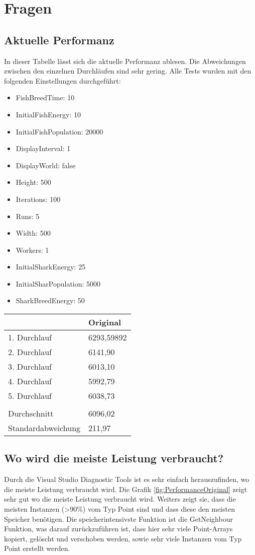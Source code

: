 \documentclass[a4paper,ngerman]{scrartcl}
\begin{document}
\section{Fragen}
\subsection{Aktuelle Performanz}
In dieser Tabelle lässt sich die aktuelle Performanz ablesen. Die Abweichungen zwischen den einzelnen Durchläufen sind sehr gering. Alle Tests wurden mit den folgenden Einstellungen durchgeführt:

\begin{itemize}
	\item FishBreedTime: 10
	\item InitialFishEnergy: 10
	\item InitialFishPopulation: 20000
	\item DisplayInterval: 1
	\item DisplayWorld: false
	\item Height: 500
	\item Iterations: 100
	\item Runs: 5
	\item Width: 500
	\item Workers: 1
	\item InitialSharkEnergy: 25
	\item InitialSharPopulation: 5000
	\item SharkBreedEnergy: 50
\end{itemize}

\centering
\begin{tabular}{l|l}
                               & Original  \\ \hline
1. Durchlauf                   & 6293,59892 \\
2. Durchlauf                   & 6141,90 \\
3. Durchlauf                   & 6013,10 \\
4. Durchlauf                   & 5992,79 \\
5. Durchlauf                   & 6038,73 \\
                               &           \\
Durchschnitt                   & 6096,02 \\
Standardabweichung             & 211,97  \\
\end{tabular}

\subsection{Wo wird die meiste Leistung verbraucht?}
Durch die Visual Studio Diagnostic Tools ist es sehr einfach herauszufinden, wo die meiste Leistung verbraucht wird. Die Grafik \ref{fig:PerformanceOriginal} zeigt sehr gut wo die meiste Leistung verbraucht wird. Weiters zeigt sie, dass die meisten Instanzen (>90\%) vom Typ Point sind und dass diese den meisten Speicher benötigen. Die speicherintensivste Funktion ist die GetNeighbour Funktion, was darauf zurückzuführen ist, dass hier sehr viele Point-Arrays kopiert, gelöscht und verschoben werden, sowie sehr viele Instanzen vom Typ Point erstellt werden. 
\end{document}
